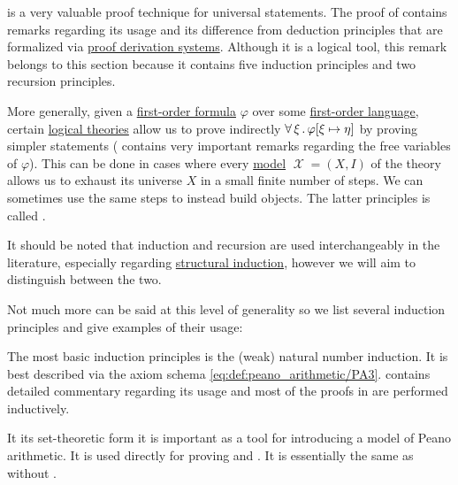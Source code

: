 \begin{remark}\label{rem:induction}
   is a very valuable proof technique for universal statements. The proof of  contains remarks regarding its usage and its difference from deduction principles that are formalized via \hyperref[def:proof_derivation_system]{proof derivation systems}. Although it is a logical tool, this remark belongs to this section because it contains five induction principles and two recursion principles.

  More generally, given a \hyperref[def:first_order_formula]{first-order formula} \( \varphi \) over some \hyperref[def:first_order_syntax]{first-order language}, certain \hyperref[def:first_order_theory]{logical theories} allow us to prove indirectly \( \forall \thinspace \xi \thinspace . \thinspace \varphi[\xi \mapsto \eta] \) by proving simpler statements ( contains very important remarks regarding the free variables of \( \varphi \)). This can be done in cases where every \hyperref[def:first_order_semantics/satisfiability]{model} \( \mscrX = (X, I) \) of the theory allows us to exhaust its universe \( X \) in a small finite number of steps. We can sometimes use the same steps to instead build objects. The latter principles is called .

  It should be noted that induction and recursion are used interchangeably in the literature, especially regarding \hyperref[rem:structural_recursion_and_induction]{structural induction}, however we will aim to distinguish between the two.

  Not much more can be said at this level of generality so we list several induction principles and give examples of their usage:
  \begin{thmenum}
     The most basic induction principles is the (weak) natural number induction. It is best described via the axiom schema \eqref{eq:def:peano_arithmetic/PA3}.  contains detailed commentary regarding its usage and most of the proofs in  are performed inductively.

    It its set-theoretic form  it is important as a tool for introducing a model of Peano arithmetic. It is used directly for proving  and . It is essentially the same as  without .


\end{thmenum}
\end{remark}
